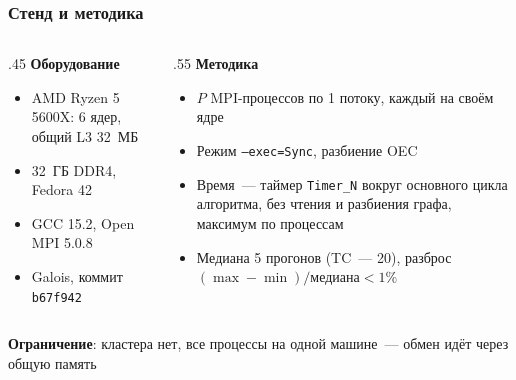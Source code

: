 \documentclass
  [ russian
  , aspectratio=1610
  ] {beamer}
\begin{document}
\begin{frame}
    \frametitle{Стенд и методика}
    \begin{columns}[T]
        \begin{column}{.45\textwidth}
            \textbf{Оборудование}
            \begin{itemize}
                \item AMD Ryzen 5 5600X: 6 ядер, общий L3 32~МБ
                \item 32~ГБ DDR4, Fedora 42
                \item GCC 15.2, Open MPI 5.0.8
                \item Galois, коммит \texttt{b67f942}
            \end{itemize}
        \end{column}
        \begin{column}{.55\textwidth}
            \textbf{Методика}
            \begin{itemize}
                \item $P$ MPI-процессов по 1 потоку, каждый на своём ядре
                \item Режим \texttt{--exec=Sync}, разбиение OEC
                \item Время~--- таймер \texttt{Timer\_N} вокруг основного цикла алгоритма,
                      без чтения и разбиения графа, максимум по процессам
                \item Медиана 5 прогонов (TC~--- 20),
                      разброс $(\max - \min)/\text{медиана} < 1\%$
            \end{itemize}
        \end{column}
    \end{columns}

    \vspace{1em}
    \textbf{Ограничение}: кластера нет, все процессы на одной машине~--- обмен идёт
    через общую память
\end{frame}
\end{document}
